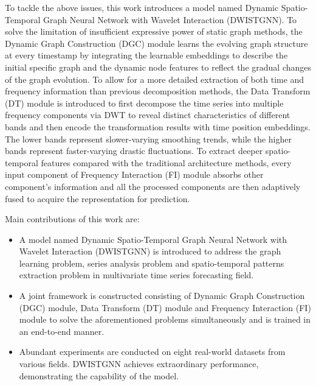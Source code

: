 \documentclass[final,12pt]{elsarticle}
\begin{document}


To tackle the above issues, this work introduces a model named 
Dynamic Spatio-Temporal Graph Neural Network with Wavelet Interaction (DWISTGNN).  %
To solve the limitation of insufficient expressive power 
of static graph methods, 
the Dynamic Graph Construction (DGC) module 
learns the evolving graph structure at every timestamp 
by integrating the learnable embeddings 
to describe the initial specific graph and 
the dynamic node features 
to reflect the gradual changes of the graph evolution.  %
To allow for a more detailed extraction 
of both time and frequency information than previous decomposition methods, 
the Data Transform (DT) module is introduced 
to first decompose the time series into multiple frequency components via DWT 
to reveal distinct characteristics of different bands 
and then encode the transformation results with time position embeddings.
The lower bands represent slower-varying smoothing trends, 
while the higher bands represent faster-varying drastic fluctuations.  %
To extract deeper spatio-temporal features 
compared with the traditional architecture methods, 
every input component of Frequency Interaction (FI) module 
absorbs other component's information and 
all the processed components are then adaptively fused 
to acquire the representation for prediction.  %


Main contributions of this work are: 
\begin{itemize}
\item
A model named Dynamic Spatio-Temporal Graph Neural Network 
with Wavelet Interaction (DWISTGNN) is introduced 
to address the graph learning problem, series analysis problem 
and spatio-temporal patterns extraction problem 
in multivariate time series forecasting field.  %
\item
A joint framework is constructed 
consisting of Dynamic Graph Construction (DGC) module, 
Data Transform (DT) module and Frequency Interaction (FI) module 
to solve the aforementioned problems simultaneously 
and is trained in an end-to-end manner.  %
\item
Abundant experiments are conducted on eight real-world datasets from various fields.
DWISTGNN achieves extraordinary performance, 
demonstrating the capability of the model.  %
\end{itemize}
\end{document}
